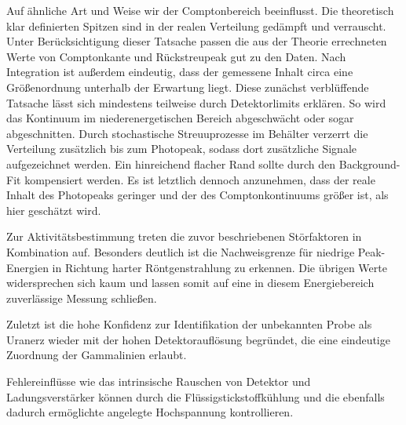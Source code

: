 Auf ähnliche Art und Weise wir der Comptonbereich beeinflusst. Die theoretisch klar definierten Spitzen sind in der realen
Verteilung gedämpft und verrauscht. Unter Berücksichtigung dieser Tatsache passen die aus der Theorie errechneten Werte von
Comptonkante und Rückstreupeak gut zu den Daten. Nach Integration ist außerdem eindeutig, dass der gemessene Inhalt circa
eine Größenordnung unterhalb der Erwartung liegt. Diese zunächst verblüffende Tatsache lässt sich mindestens teilweise durch
Detektorlimits erklären. So wird das Kontinuum im niederenergetischen Bereich abgeschwächt oder sogar abgeschnitten. Durch
stochastische Streuuprozesse im Behälter verzerrt die Verteilung zusätzlich bis zum Photopeak, sodass dort zusätzliche Signale
aufgezeichnet werden. Ein hinreichend flacher Rand sollte durch den Background-Fit kompensiert werden. Es ist letztlich dennoch
anzunehmen, dass der reale Inhalt des Photopeaks geringer und der des Comptonkontinuums größer ist, als hier geschätzt wird.

Zur Aktivitätsbestimmung treten die zuvor beschriebenen Störfaktoren in Kombination auf. Besonders deutlich ist die Nachweisgrenze für
niedrige Peak-Energien in Richtung harter Röntgenstrahlung zu erkennen. Die übrigen Werte widersprechen sich kaum und lassen somit auf
eine in diesem Energiebereich zuverlässige Messung schließen.

Zuletzt ist die hohe Konfidenz zur Identifikation der unbekannten Probe als Uranerz wieder mit der hohen Detektorauflösung
begründet, die eine eindeutige Zuordnung der Gammalinien erlaubt. 

Fehlereinflüsse wie das intrinsische Rauschen von Detektor und Ladungsverstärker können durch die Flüssigstickstoffkühlung und die
ebenfalls dadurch ermöglichte angelegte Hochspannung kontrollieren.
